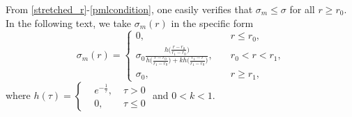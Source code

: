 \documentclass[11pt]{article}
\newcommand{\ds}{\displaystyle}
\newcommand{\sig}{\sigma}
\begin{document}
From \eqref{stretched_r}-\eqref{pmlcondition}, one easily verifies that $\sig_m\leq\sig$ for 
all $r\geq r_0$. In the following text, we take $\sig_m(r)$ in the specific form
\begin{equation}\label{sigma_m}
\sig_m(r)=
\begin{cases}
0, & r \leq r_0,\\
\ds\sig_0\frac{h\Big(\frac{r-r_0}{r_1-r_0}\Big)}{h\Big(\frac{r-r_0}{r_1-r_0}\Big)
+kh\Big(\frac{r_1-r}{r_1-r_0}\Big)},\quad& r_0< r < r_1, \\
\sig_0,&r \geq r_1,
\end{cases}
\end{equation}
where $h(\tau)=\left\{
\begin{aligned}
&e^{-\frac{1}{\tau}},\;  &\tau>0\\
& 0,&\tau\leq 0
\end{aligned}
\right.$ and $0<k<1$.
\end{document}
